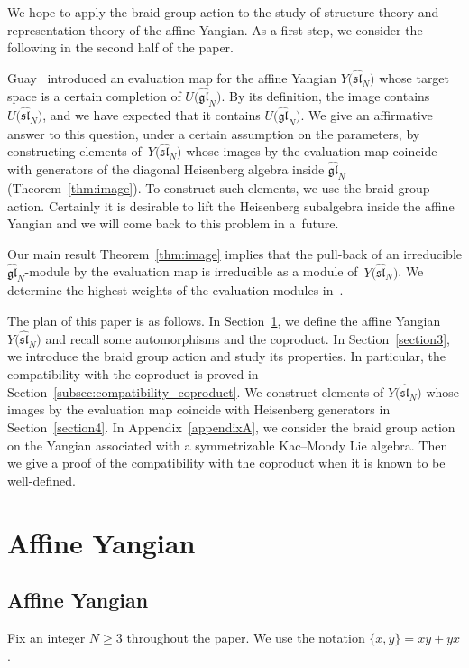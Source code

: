 \documentclass[pdftex]{sigma}
\theoremstyle{definition}
\numberwithin{equation}{section}
\newcommand{\affY}{Y\big(\affsl\big)}
\newcommand{\gl}{\mathfrak{gl}}
\newcommand{\affsl}{\hat{\mathfrak{sl}}_N}
\begin{document}
We hope to apply the braid group action to the study of structure theory and representation theory of the affine Yangian. As a first step, we consider the following in the second half of the paper.

Guay~\cite{MR2323534} introduced an evaluation map for the affine Yangian $\affY$ whose target space is a certain completion of $U\big(\hat{\gl}_N\big)$. By its definition, the image contains~$U\big(\affsl\big)$, and we have expected that it contains $U\big(\hat{\gl}_N\big)$. We give an affirmative answer to this question, under a certain assumption on the parameters, by constructing elements of~$\affY$ whose images by the evaluation map coincide with generators of the diagonal Heisenberg algebra inside $\hat{\gl}_N$ (Theorem~\ref{thm:image}). To construct such elements, we use the braid group action. Certainly it is desirable to lift the Heisenberg subalgebra inside the affine Yangian and we will come back to this problem in a~future.

Our main result Theorem~\ref{thm:image} implies that the pull-back of an irreducible $\hat{\gl}_N$-module by the evaluation map is irreducible as a module of~$\affY$. We determine the highest weights of the evaluation modules in~\cite{kodera_evaluation}.

The plan of this paper is as follows. In Section~\ref{sec:affine_Yangian}, we define the affine Yangian $\affY$ and recall some automorphisms and the coproduct. In Section~\ref{section3}, we introduce the braid group action and study its properties. In particular, the compatibility with the coproduct is proved in Section~\ref{subsec:compatibility_coproduct}. We construct elements of $\affY$ whose images by the evaluation map coincide with Heisenberg generators in Section~\ref{section4}. In Appendix~\ref{appendixA}, we consider the braid group action on the Yangian associated with a symmetrizable Kac--Moody Lie algebra. Then we give a proof of the compatibility with the coproduct when it is known to be well-defined.

\section{Affine Yangian}\label{sec:affine_Yangian}

\subsection{Affine Yangian}

Fix an integer $N \geq 3$ throughout the paper. We use the notation $\{x,y\}=xy+yx$.
\end{document}
